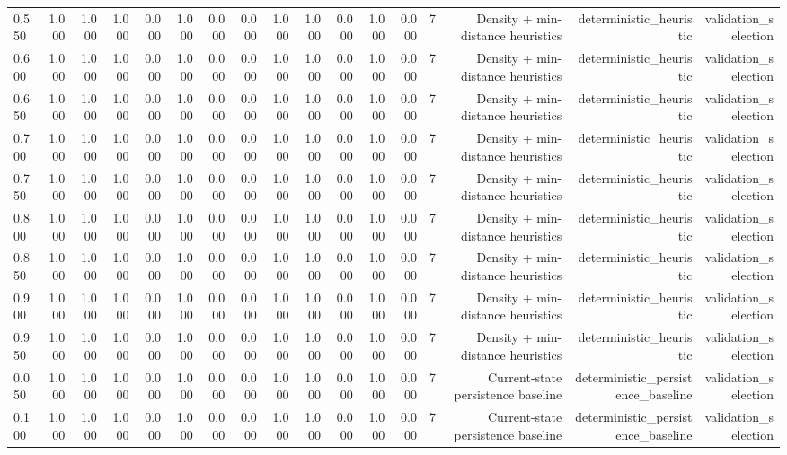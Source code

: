 \begin{tabular}{lrrrrrrrrrrrrrrrr}
0.550 & 1.000 & 1.000 & 1.000 & 0.000 & 1.000 & 0.000 & 0.000 & 1.000 & 1.000 & 0.000 & 1.000 & 0.000 & 7 & Density + min-distance heuristics & deterministic\_heuristic & validation\_selection \\
0.600 & 1.000 & 1.000 & 1.000 & 0.000 & 1.000 & 0.000 & 0.000 & 1.000 & 1.000 & 0.000 & 1.000 & 0.000 & 7 & Density + min-distance heuristics & deterministic\_heuristic & validation\_selection \\
0.650 & 1.000 & 1.000 & 1.000 & 0.000 & 1.000 & 0.000 & 0.000 & 1.000 & 1.000 & 0.000 & 1.000 & 0.000 & 7 & Density + min-distance heuristics & deterministic\_heuristic & validation\_selection \\
0.700 & 1.000 & 1.000 & 1.000 & 0.000 & 1.000 & 0.000 & 0.000 & 1.000 & 1.000 & 0.000 & 1.000 & 0.000 & 7 & Density + min-distance heuristics & deterministic\_heuristic & validation\_selection \\
0.750 & 1.000 & 1.000 & 1.000 & 0.000 & 1.000 & 0.000 & 0.000 & 1.000 & 1.000 & 0.000 & 1.000 & 0.000 & 7 & Density + min-distance heuristics & deterministic\_heuristic & validation\_selection \\
0.800 & 1.000 & 1.000 & 1.000 & 0.000 & 1.000 & 0.000 & 0.000 & 1.000 & 1.000 & 0.000 & 1.000 & 0.000 & 7 & Density + min-distance heuristics & deterministic\_heuristic & validation\_selection \\
0.850 & 1.000 & 1.000 & 1.000 & 0.000 & 1.000 & 0.000 & 0.000 & 1.000 & 1.000 & 0.000 & 1.000 & 0.000 & 7 & Density + min-distance heuristics & deterministic\_heuristic & validation\_selection \\
0.900 & 1.000 & 1.000 & 1.000 & 0.000 & 1.000 & 0.000 & 0.000 & 1.000 & 1.000 & 0.000 & 1.000 & 0.000 & 7 & Density + min-distance heuristics & deterministic\_heuristic & validation\_selection \\
0.950 & 1.000 & 1.000 & 1.000 & 0.000 & 1.000 & 0.000 & 0.000 & 1.000 & 1.000 & 0.000 & 1.000 & 0.000 & 7 & Density + min-distance heuristics & deterministic\_heuristic & validation\_selection \\
0.050 & 1.000 & 1.000 & 1.000 & 0.000 & 1.000 & 0.000 & 0.000 & 1.000 & 1.000 & 0.000 & 1.000 & 0.000 & 7 & Current-state persistence baseline & deterministic\_persistence\_baseline & validation\_selection \\
0.100 & 1.000 & 1.000 & 1.000 & 0.000 & 1.000 & 0.000 & 0.000 & 1.000 & 1.000 & 0.000 & 1.000 & 0.000 & 7 & Current-state persistence baseline & deterministic\_persistence\_baseline & validation\_selection \\

\end{tabular}
